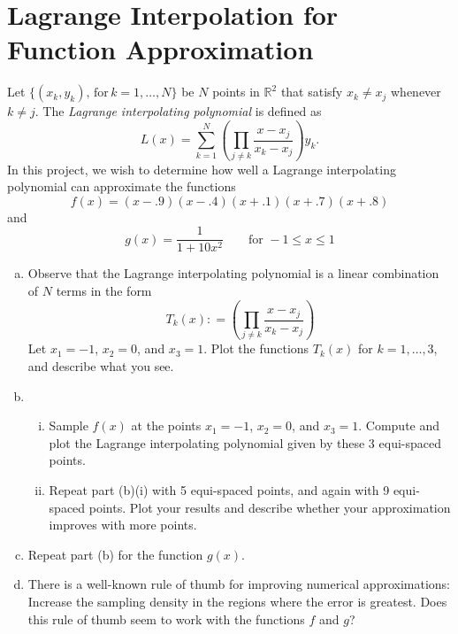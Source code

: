 
\section{Lagrange Interpolation for Function Approximation}
Let $\{(x_k,y_k) ,\,\text{for}\, k = 1, \dots, N\}$ be $N$ points in $\mathbb{R}^2$ that satisfy $x_k \neq x_j$ whenever $k \neq j$. The \textit{Lagrange interpolating polynomial} is defined as
\begin{equation}
L(x) = \sum_{k = 1}^N \left(\prod_{j \neq k}\frac{x-x_j}{x_k-x_j} \right) y_k.
\end{equation}
In this project, we wish to determine how well a Lagrange interpolating polynomial can approximate the functions 
\begin{equation}
f(x) = (x-.9)(x-.4)(x+.1)(x+.7)(x+.8)
\end{equation}
and 
\begin{equation}
g(x) = \frac{1}{1+10x^2} \quad \quad \text{for } -1 \leq x \leq 1
\end{equation}
\begin{enumerate}[(a)]
    \item Observe that the Lagrange interpolating polynomial is a linear combination of $N$ terms in the form
    \begin{equation}
    T_k(x): =\left( \prod_{j \neq k}\frac{x-x_j}{x_k-x_j}  \right) 
    \end{equation}
    Let $x_1= -1$, $x_2 = 0$, and $x_3 = 1$. Plot the functions $T_k(x)$ for $k = 1,\dots,3$, and describe what you see.
    \item 
    \begin{enumerate}[i.]
      \item Sample $f(x)$ at the points $x_1 = -1$, $x_2 = 0$, and $x_3= 1$. Compute and plot the Lagrange interpolating polynomial given by these 3 equi-spaced points.
      \item Repeat part (b)(i) with 5 equi-spaced points, and again with 9 equi-spaced points. Plot your results and describe whether your approximation improves with more points. 
    \end{enumerate}
    \item Repeat part (b) for the function $g(x)$.
    \item There is a well-known rule of thumb for improving numerical approximations: Increase the sampling density in the regions where the error is greatest. Does this rule of thumb seem to work with the functions $f$ and $g$?
\end{enumerate}

